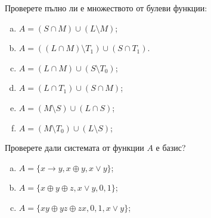 \begin{problem} %
  Проверете пълно ли е множеството от булеви функции:
  \begin{enumerate}[a)]
  \item
    $A = (S\cap M)\cup(L\setminus M)$;
  \item
    $A = ((L\cap M)\setminus T_1)\cup (S\cap T_1)$.
  \item
    $A = (L\cap M)\cup (S\setminus T_0)$;
  \item
    $A = (L\cap T_1)\cup (S\cap M)$;
  \item
    $A = (M\setminus S)\cup(L\cap S)$;
  \item
    $A = (M\setminus T_0)\cup (L\setminus S)$;
  \end{enumerate}
\end{problem}

\begin{problem}
  Проверете дали системата от функции $A$ е базис?
  \begin{enumerate}[a)]
  \item
    $A = \{x\rightarrow y, x\oplus y, x\vee y\}$;
  \item
    $A = \{x\oplus y\oplus z, x\vee y, 0, 1\}$;
  \item
    $A = \{xy\oplus yz\oplus zx, 0, 1, x\vee y\}$;
  \end{enumerate}
\end{problem}




